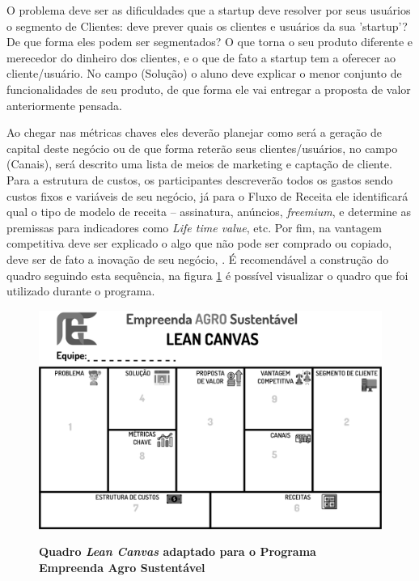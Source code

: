 O problema deve ser as dificuldades que a startup deve resolver por seus usuários o segmento de Clientes: deve prever quais os clientes e usuários da sua ’startup’? De que forma eles podem ser segmentados? O que torna o seu produto diferente e merecedor do dinheiro dos clientes, e o que de fato a startup tem a oferecer ao cliente/usuário. No campo (Solução) o aluno deve explicar o menor conjunto de funcionalidades de seu produto, de que forma ele vai entregar a proposta de valor anteriormente pensada. 

Ao chegar nas métricas chaves eles deverão planejar como será a geração de capital deste negócio ou de que forma reterão seus clientes/usuários, no campo (Canais), será descrito uma lista de meios de marketing e captação de cliente. Para a estrutura de custos, os participantes descreverão todos os gastos sendo custos fixos e variáveis de seu negócio, já para o Fluxo de Receita ele identificará qual o tipo de modelo de receita – assinatura, anúncios, \textit{freemium}, e determine as premissas para indicadores como \textit{Life time value}, etc. Por fim, na vantagem competitiva deve ser explicado o algo que não pode ser comprado ou copiado, deve ser de fato a inovação de seu negócio, \cite{maurya_running_2012, sebrae_aprenda_2019}. É recomendável a construção do quadro seguindo esta sequência, na figura \ref{figura_7} é possível visualizar o quadro que foi utilizado durante o programa. 



\begin{figure}[h!]
\centering
\caption{\textbf{Quadro \textit{Lean Canvas} adaptado para o Programa Empreenda Agro Sustentável}}
\includegraphics[scale=0.2]{Imagens/canvas.png}
\label{figura_7}
\end{figure}
\newpage


